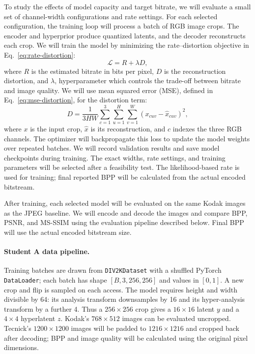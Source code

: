 \documentclass[11pt]{article}
\begin{document}
To study the effects of model capacity and target bitrate, we will
evaluate a small set of channel-width configurations and rate settings.
For each selected configuration, the training loop will process a
batch of RGB image crops. The encoder and hyperprior produce quantized
latents, and the decoder reconstructs each crop. We will train the
model by minimizing the rate--distortion objective in
Eq.~\ref{eq:rate-distortion}:
\begin{equation}
    \mathcal{L} = R + \lambda D,
    \label{eq:rate-distortion}
\end{equation}
where $R$ is the estimated bitrate in bits per pixel, $D$ is the
reconstruction distortion, and $\lambda$, hyperparameter which controls the trade-off
between bitrate and image quality. We will use mean squared error
(MSE), defined in Eq.~\ref{eq:mse-distortion}, for the distortion
term:
\begin{equation}
    D = \frac{1}{3HW}\sum_{c=1}^{3}\sum_{u=1}^{H}\sum_{v=1}^{W}
        \left(x_{cuv} - \hat{x}_{cuv}\right)^2,
    \label{eq:mse-distortion}
\end{equation}
where $x$ is the input crop, $\hat{x}$ is its reconstruction, and
$c$ indexes the three RGB channels. The optimizer will backpropagate
this loss to update the model weights over repeated batches. We will
record validation results and save model checkpoints during training.
The exact widths, rate settings, and training parameters will be
selected after a feasibility test. The likelihood-based rate is used
for training; final reported BPP will be calculated from the actual
encoded bitstream.

After training, each selected model will be evaluated on the same
Kodak images as the JPEG baseline. We will encode and decode the images
and compare BPP, PSNR, and MS-SSIM using the evaluation pipeline
described below. Final BPP will use the actual encoded bitstream size.

\paragraph{Student A data pipeline.} Training batches are drawn from
\texttt{DIV2KDataset} with a shuffled PyTorch \texttt{DataLoader}; each batch has
shape $[B,3,256,256]$ and values in $[0,1]$. A new crop and flip is sampled on
each access. The model requires height and width divisible by 64: its analysis
transform downsamples by 16 and its hyper-analysis transform by a further 4.
Thus a $256\times256$ crop gives a $16\times16$ latent $y$ and a $4\times4$
hyperlatent $z$. Kodak's $768\times512$ images can be evaluated uncropped.
Tecnick's $1200\times1200$ images will be padded to $1216\times1216$ and cropped
back after decoding; BPP and image quality will be calculated using the original
pixel dimensions.
\end{document}
